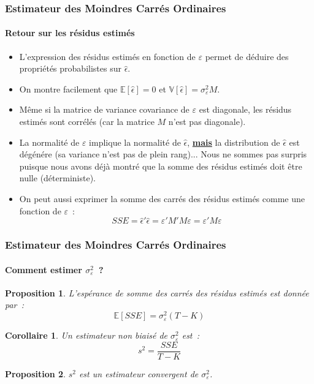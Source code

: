 \documentclass[10pt]{beamer}
\theoremstyle{plain}
\newtheorem{prop}{Proposition}
\newtheorem{cor}{Corollaire}
\begin{document}
\begin{frame}
  \frametitle{Estimateur des Moindres Carrés Ordinaires}
  \framesubtitle {Retour sur les résidus estimés}

  \begin{itemize}

  \item L'expression des résidus estimés en fonction de $\varepsilon$ permet de déduire des propriétés probabilistes sur $\hat\epsilon$.\newline

  \item On montre facilement que $\mathbb E[\hat\epsilon] = 0$ et $\mathbb V[\hat\epsilon] = \sigma_{\varepsilon}^2M$.\newline

  \item Même si la matrice de variance covariance de $\varepsilon$ est diagonale, les résidus estimés sont corrélés (car la matrice $M$ n'est pas diagonale).\newline

  \item La normalité de $\varepsilon$ implique la normalité de $\hat\epsilon$, \underline{\textbf{mais}} la distribution de $\hat\epsilon$ est dégénére (sa variance n'est pas de plein rang)... Nous ne sommes pas surpris puisque nous avons déjà montré que la somme des résidus estimés doit être nulle (déterministe).\newline

  \item On peut aussi exprimer la somme des carrés des résidus estimés comme une fonction de $\varepsilon$~:
    \[
      SSE = \hat\epsilon'\hat\epsilon = \varepsilon'M'M \varepsilon = \varepsilon' M \varepsilon
    \]

  \end{itemize}

\end{frame}


\begin{frame}
  \frametitle{Estimateur des Moindres Carrés Ordinaires}
  \framesubtitle {Comment estimer $\sigma_{\varepsilon}^2$~?}

  \begin{prop}\label{prop:sse:expectation}
    L'espérance de somme des carrés des résidus estimés est donnée par~:
    \[
      \mathbb E [SSE] = \sigma_{\varepsilon}^2(T-K)
    \]
  \end{prop}


  \begin{cor}\label{cor:s2}
    Un estimateur non biaisé de $\sigma_{\varepsilon}^2$ est~:
    \[
      s^2 = \frac{SSE}{T-K}
    \]
  \end{cor}


  \begin{prop}\label{prop:s2}
    $s^2$ est un estimateur convergent de $\sigma_{\varepsilon}^2$.
  \end{prop}

\end{frame}
\end{document}
